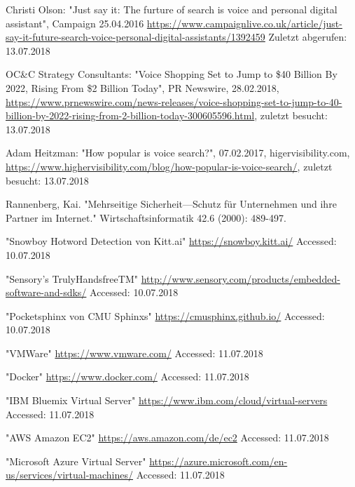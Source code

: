 \documentclass[journal]{IEEEtran}
\begin{document}
\ifCLASSOPTIONcaptionsoff
  \newpage
\fi

\begin{thebibliography}{1}
Christi Olson: "Just say it: The furture of search is voice and personal digital assistant", Campaign 25.04.2016 \url{https://www.campaignlive.co.uk/article/just-say-it-future-search-voice-personal-digital-assistants/1392459} Zuletzt abgerufen: 13.07.2018

OC\&C Strategy Consultants: "Voice Shopping Set to Jump to \$40 Billion By 2022, Rising From \$2 Billion Today", PR Newswire, 28.02.2018, \url{https://www.prnewswire.com/news-releases/voice-shopping-set-to-jump-to-40-billion-by-2022-rising-from-2-billion-today-300605596.html}, zuletzt besucht: 13.07.2018

Adam Heitzman: "How popular is voice search?", 07.02.2017, higervisibility.com, \url{https://www.highervisibility.com/blog/how-popular-is-voice-search/}, zuletzt besucht: 13.07.2018

Rannenberg, Kai. "Mehrseitige Sicherheit—Schutz für Unternehmen und ihre Partner im Internet." Wirtschaftsinformatik 42.6 (2000): 489-497.



	
"Snowboy Hotword Detection von Kitt.ai"
\url{https://snowboy.kitt.ai/}
Accessed: 10.07.2018

"Sensory's TrulyHandsfreeTM"
\url{http://www.sensory.com/products/embedded-software-and-sdks/}
Accessed: 10.07.2018

"Pocketsphinx von CMU Sphinxs"
\url{https://cmusphinx.github.io/}
Accessed: 10.07.2018

"VMWare"
\url{https://www.vmware.com/}
Accessed: 11.07.2018

"Docker"
\url{https://www.docker.com/}
Accessed: 11.07.2018

"IBM Bluemix Virtual Server"
\url{https://www.ibm.com/cloud/virtual-servers}
Accessed: 11.07.2018

"AWS Amazon EC2"
\url{https://aws.amazon.com/de/ec2}
Accessed: 11.07.2018

"Microsoft Azure Virtual Server"
\url{https://azure.microsoft.com/en-us/services/virtual-machines/}
Accessed: 11.07.2018


\end{thebibliography}
\end{document}

